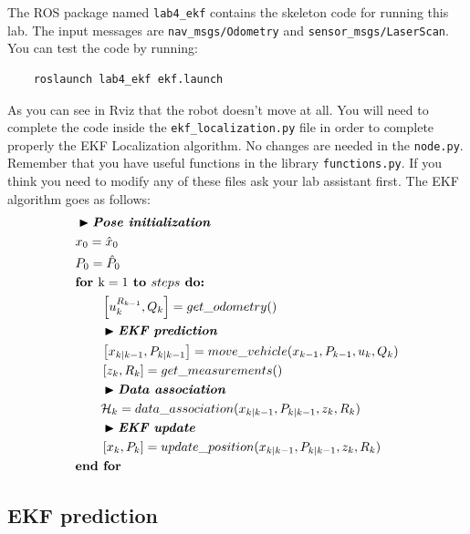 \documentclass[a4paper,10pt]{article}
\begin{document}
The ROS package named \texttt{lab4\_ekf} contains the skeleton code for running this lab. The input messages are \texttt{nav\_msgs/Odometry} and \texttt{sensor\_msgs/LaserScan}. You can test the code by running:
\begin{verbatim}
    roslaunch lab4_ekf ekf.launch
\end{verbatim}
\noindent
As you can see in Rviz that the robot doesn't move at all. You will need to complete the code inside the \texttt{ekf\_localization.py} file in order to complete properly the EKF Localization algorithm. No changes are needed in the \texttt{node.py}. Remember that you have useful functions in the library \texttt{functions.py}. If you think you need to modify any of these files ask your lab assistant first. The EKF algorithm goes as follows:
\begin{align*} \scriptsize
    & \blacktriangleright \textit{\textbf{Pose initialization}}\\
    & x_0 = \hat{x}_0 \\
    & P_0 = \hat{P}_0 \\
    & \textbf{for } \text{k} = 1 \textbf{ to } steps \textbf{ do:} \\
    & \qquad \left[ u_k^{R_{k-1}}, Q_k \right] = get\_odometry() \\
    & \qquad \blacktriangleright \textit{\textbf{EKF prediction}}\\
    & \qquad \left[ x_{k|k-1}, P_{k|k-1} \right] = move\_vehicle(x_{k-1}, P_{k-1}, u_k, Q_k) \\
    & \qquad \left[ z_k, R_k \right] = get\_measurements() \\
    & \qquad \blacktriangleright \textit{\textbf{Data association}}\\
    & \qquad \mathcal{H}_k = data\_association(x_{k|k-1}, P_{k|k-1}, z_k, R_k) \\
    & \qquad \blacktriangleright \textit{\textbf{EKF update}}\\
    & \qquad \left[ x_k, P_k \right] = update\_position(x_{k|k-1}, P_{k|k-1}, z_k, R_k) \\
    & \textbf{end for}
\end{align*}

\subsection{EKF prediction}
\end{document}
